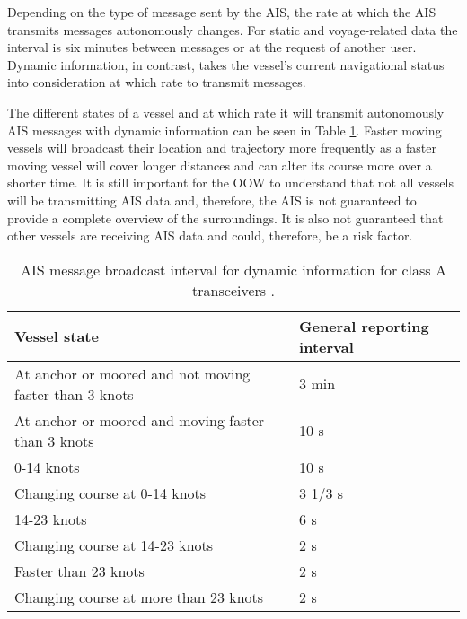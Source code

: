 \documentclass[../main.tex]{subfiles}
\begin{document}
Depending on the type of message sent by the AIS, the rate at which the AIS transmits messages autonomously changes. For static and voyage-related data the interval is six minutes between messages or at the request of another user. Dynamic information, in contrast, takes the vessel's current navigational status into consideration at which rate to transmit messages.

The different states of a vessel and at which rate it will transmit autonomously AIS messages with dynamic information can be seen in Table \ref{tab:ais-rates}. Faster moving vessels will broadcast their location and trajectory more frequently as a faster moving vessel will cover longer distances and can alter its course more over a shorter time. It is still important for the OOW to understand that not all vessels will be transmitting AIS data and, therefore, the AIS is not guaranteed to provide a complete overview of the surroundings. It is also not guaranteed that other vessels are receiving AIS data and could, therefore, be a risk factor. 

\begin{table}[H]
\centering
\begin{tabular}{|m{7cm}|m{4cm}|}
\hline
\rowcolor[HTML]{C0C0C0} 
\textbf{Vessel state}                                  & \textbf{General reporting interval} \\ \hline
At anchor or moored and not moving faster than 3 knots & 3 min                               \\ \hline
At anchor or moored and moving faster than 3 knots     & 10 s                                \\ \hline
0-14 knots                                             & 10 s                                \\ \hline
Changing course at 0-14 knots                          & 3 1/3 s                             \\ \hline
14-23 knots                                            & 6 s                                 \\ \hline
Changing course at 14-23 knots                         & 2 s                                 \\ \hline
Faster than 23 knots                                   & 2 s                                 \\ \hline
Changing course at more than 23 knots                  & 2 s                                 \\ \hline
\end{tabular}
\caption{AIS message broadcast interval for dynamic information for class A transceivers \cite{IMO_2015}.}
\label{tab:ais-rates}
\end{table}
\end{document}
